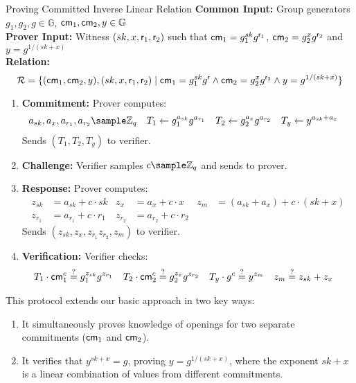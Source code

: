 \begin{protocol}{Proving Committed Inverse Linear Relation}{}\label{pok-committed-inverse-linear-relation}
\textbf{Common Input:} Group generators $g_1, g_2, g \in \mathbb{G}$, $\mathsf{cm}_1, \mathsf{cm}_2, y \in \mathbb{G}$ \\
\textbf{Prover Input:} Witness $(sk, x, \mathsf{r}_1, \mathsf{r}_2)$ such that $\mathsf{cm}_1 = g_1^{sk} g^{\mathsf{r}_1}$, $\mathsf{cm}_2 = g_2^{x}g^{\mathsf{r}_2}$ and $ y = g^{1/(sk + x)}$ \\
\textbf{Relation: }
\[
\mathcal{R} = \{(\mathsf{cm}_1,\mathsf{cm}_2, y), (sk, x, \mathsf{r}_1, \mathsf{r}_2) \mid \mathsf{cm}_1 = g_1^{sk} g^{\mathsf{r}} \wedge \mathsf{cm}_2 = g_2^{x}g^{\mathsf{r}_2} \wedge y = g^{1/(sk + x)}\}
\]
\begin{enumerate}
    \item \textbf{Commitment:} Prover computes:
    \begin{align*}
        a_{sk}, a_x, a_{r_1}, a_{r_2} &\sample \Z_q & T_1 &\gets g_1^{a_{sk}} g^{a_{r_1}} & T_2 &\gets g_2^{a_x} g^{a_{r_2}} & T_y &\gets y^{a_{sk} + a_x}
    \end{align*}
    Sends $(T_1, T_2, T_y)$ to verifier.
    
    \item \textbf{Challenge:} Verifier samples $c \sample \mathbb{Z}_q$ and sends to prover.
    
    \item \textbf{Response:} Prover computes:
     \begin{align*}
        z_{sk} &= a_{sk} + c \cdot sk & z_x &= a_x + c \cdot x &  z_m &= (a_{sk} + a_x) + c \cdot (sk + x)\\   
        z_{r_1} &= a_{r_1} + c \cdot r_1 & z_{r_2} &= a_{r_2} + c \cdot r_2
    \end{align*}
    Sends $(z_{sk}, z_x, z_{r_1} z_{r_2}, z_m)$ to verifier.
    
    \item \textbf{Verification:} Verifier checks:
    \begin{align*}
        T_1 \cdot \mathsf{cm}_1^c &\stackrel{?}{=} g_1^{z_{sk}}g^{z_{r_1}} 
        &
        T_2 \cdot \mathsf{cm}_2^c &\stackrel{?}{=}  g_2^{z_x} g^{z_{r_2}} 
        &
        T_y \cdot g^c &\stackrel{?}{=} y^{z_m} &
        z_m &\stackrel{?}{=} z_{sk} + z_x
    \end{align*}
\end{enumerate}
\end{protocol}


This protocol extends our basic approach in two key ways:
\begin{enumerate}
    \item It simultaneously proves knowledge of openings for two separate commitments ($\mathsf{cm}_1$ and $\mathsf{cm}_2$).
    \item It verifies that $y^{sk+x} = g$, proving $y = g^{1/(sk+x)}$, where the exponent $sk+x$ is a linear combination of values from different commitments.
\end{enumerate}

